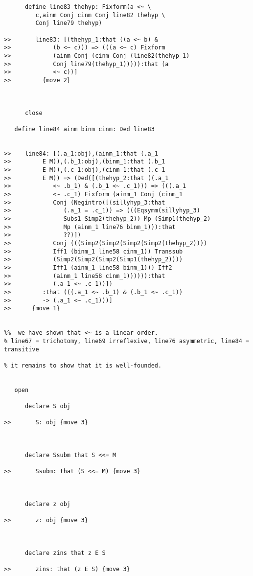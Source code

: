 \documentclass[12pt]{article}
\begin{document}
\begin{verbatim}
      define line83 thehyp: Fixform(a <~ \
         c,ainm Conj cinm Conj line82 thehyp \
         Conj line79 thehyp)

>>       line83: [(thehyp_1:that ((a <~ b) &
>>            (b <~ c))) => (((a <~ c) Fixform
>>            (ainm Conj (cinm Conj (line82(thehyp_1)
>>            Conj line79(thehyp_1))))):that (a
>>            <~ c))]
>>         {move 2}



      close

   define line84 ainm binm cinm: Ded line83


>>    line84: [(.a_1:obj),(ainm_1:that (.a_1
>>         E M)),(.b_1:obj),(binm_1:that (.b_1
>>         E M)),(.c_1:obj),(cinm_1:that (.c_1
>>         E M)) => (Ded([(thehyp_2:that ((.a_1
>>            <~ .b_1) & (.b_1 <~ .c_1))) => (((.a_1
>>            <~ .c_1) Fixform (ainm_1 Conj (cinm_1
>>            Conj (Negintro([(sillyhyp_3:that
>>               (.a_1 = .c_1)) => (((Eqsymm(sillyhyp_3)
>>               Subs1 Simp2(thehyp_2)) Mp (Simp1(thehyp_2)
>>               Mp (ainm_1 line76 binm_1))):that
>>               ??)])
>>            Conj (((Simp2(Simp2(Simp2(Simp2(thehyp_2))))
>>            Iff1 (binm_1 line58 cinm_1)) Transsub
>>            (Simp2(Simp2(Simp2(Simp1(thehyp_2))))
>>            Iff1 (ainm_1 line58 binm_1))) Iff2
>>            (ainm_1 line58 cinm_1)))))):that
>>            (.a_1 <~ .c_1))])
>>         :that (((.a_1 <~ .b_1) & (.b_1 <~ .c_1))
>>         -> (.a_1 <~ .c_1)))]
>>      {move 1}


%%  we have shown that <~ is a linear order. 
% line67 = trichotomy, line69 irreflexive, line76 asymmetric, line84 = transitive

% it remains to show that it is well-founded.


   open

      declare S obj

>>       S: obj {move 3}



      declare Ssubm that S <<= M

>>       Ssubm: that (S <<= M) {move 3}



      declare z obj

>>       z: obj {move 3}



      declare zins that z E S

>>       zins: that (z E S) {move 3}




\end{verbatim}
\end{document}
